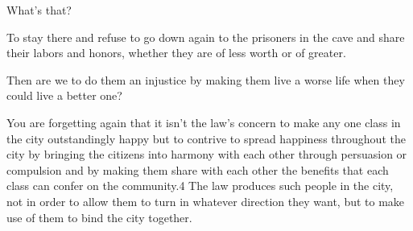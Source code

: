 			What's that? 

			To stay there and refuse to go down again to the prisoners in the cave and share their labors and honors, whether they are of less worth or of greater. 

			Then are we to do them an injustice by making them live a worse life when they could live a better one? 

			You are forgetting again that it isn't the law's concern to make any one class in the city outstandingly happy but to contrive to spread happiness throughout the city by bringing the citizens into harmony with each other through persuasion or compulsion and by making them share with each other the benefits that each class can confer on the community.4 The law produces such people in the city, not in order to allow them to turn in whatever direction they want, but to make use of them to bind the city together.